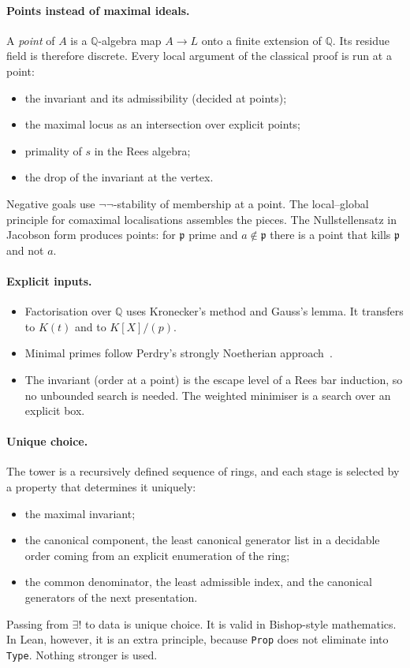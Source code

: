 \documentclass[11pt]{article}
\newcommand{\Q}{\mathbb{Q}}
\newcommand{\p}{\mathfrak{p}}
\newcommand{\code}[1]{\texttt{#1}}
\begin{document}
\paragraph{Points instead of maximal ideals.}
A \emph{point} of $A$ is a $\Q$-algebra map $A\to L$ onto a finite extension of $\Q$. Its residue
field is therefore discrete. Every local argument of the classical proof is run at a point:
\begin{itemize}
\item the invariant and its admissibility (decided at points);
\item the maximal locus as an intersection over explicit points;
\item primality of $s$ in the Rees algebra;
\item the drop of the invariant at the vertex.
\end{itemize}
Negative goals use $\neg\neg$-stability of membership at a point. The local--global principle for
comaximal localisations \cite{LQ} assembles the pieces. The Nullstellensatz in Jacobson
form produces points: for $\p$ prime and $a\notin\p$ there is a point that kills $\p$ and not $a$.

\paragraph{Explicit inputs.}
\begin{itemize}
\item Factorisation over $\Q$ uses Kronecker's method and Gauss's lemma. It transfers to
  $K(t)$ and to $K[X]/(p)$.
\item Minimal primes follow Perdry's strongly Noetherian approach~\cite{P}.
\item The invariant (order at a point) is the escape level of a Rees bar induction, so no
  unbounded search is needed. The weighted minimiser is a search over an explicit box.
\end{itemize}

\paragraph{Unique choice.}
The tower is a recursively defined sequence of rings, and each stage is selected by a property
that determines it uniquely:
\begin{itemize}
\item the maximal invariant;
\item the canonical component, the least canonical generator list in a decidable order coming
  from an explicit enumeration of the ring;
\item the common denominator, the least admissible index, and the canonical generators of the
  next presentation.
\end{itemize}
Passing from $\exists!$ to data is unique choice. It is valid in Bishop-style mathematics. In
Lean, however, it is an extra principle, because \code{Prop} does not eliminate into \code{Type}.
Nothing stronger is used.
\end{document}

